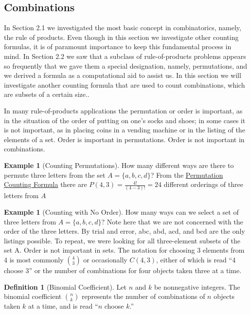 \documentclass[10pt,]{book}
\theoremstyle{plain}
\theoremstyle{definition}
\newtheorem{definition}[theorem]{Definition}
\newtheorem{example}[theorem]{Example}
\begin{document}
\subsection[Combinations]{Combinations}\label{combinations}
 In Section 2.1 we investigated the most basic concept in combinatorics, namely, the rule of products. Even though in this section we investigate other counting formulas, it is of paramount importance to keep this fundamental process in mind. In Section 2.2 we saw that a subclass of rule-of-products problems appears so frequently that we gave them a special designation, namely, permutations, and we derived a formula as a computational aid to assist us. In this section we will investigate another counting formula that are used to count combinations, which are subsets of a certain size..%
\par
In many rule-of-products applications the permutation or order is important, as in the situation of the order of putting on one's socks and shoes; in some cases it is not important, as in placing coins in a vending machine or in the listing of the elements of a set. Order is important in permutations. Order is not important in combinations.%
\begin{example}[Counting Permutations]\label{counting-permuations-multiple-ways}
How many different ways are there to permute three letters from the set \(A = \{a, b, c, d\}\)?  From the \hyperref[permutations-counting-formula]{Permutation Counting Formula} there are \(P(4,3)=\frac{4!}{(4-3)!} = 24\) different orderings of three letters from \(A\)\end{example}
\begin{example}[Counting with No Order]\label{four-choose-three}
How many ways can we select a set of three letters from  \(A = \{a, b, c, d\}\)?  Note here that we are not concerned with the order of the three letters. By trial and error, abc, abd, acd, and bcd are the only listings possible. To repeat, we were looking for all three-element subsets of the set A. Order is not important in sets. The notation for choosing 3 elements from 4 is most commonly \(\binom{4}{3}\) or occasionally \(C(4,3)\), either of which is read ``4 choose 3'' or the number of combinations for four objects taken three at a time.\end{example}
\begin{definition}[Binomial Coefficient]\label{binomial-coefficient}
Let \(n\) and \(k\) be nonnegative integers.  The binomial coefficient \(\binom{n}{k}\) represents the number of combinations of \(n\) objects taken \(k\) at a time, and is read ``\(n\) choose \(k\).''%
\end{definition}
\end{document}
